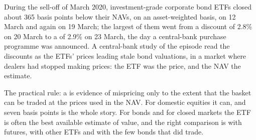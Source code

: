 \begin{example}[March 2020]\label{ex:m1:exchange-traded-funds:march}
During the sell-off of March 2020, investment-grade corporate bond ETFs
closed about 365 basis points below their NAVs, on an asset-weighted basis,
on 12 March and again on 19 March; the largest of them went from a discount
of 2.8\% on 20 March to a  of 2.9\% on 23 March, the day a central-bank
purchase programme was announced. A central-bank study of the episode read
the discounts as the ETFs' prices leading stale bond valuations, in a market
where dealers had stopped making prices: the ETF was the price, and the NAV
the estimate.
\end{example}

\begin{omfigure}

\label{fig:m1:exchange-traded-funds:stale}
\end{omfigure}

The practical rule: a  is evidence of mispricing only to the extent
that the basket can be traded at the prices used in the NAV. For domestic
equities it can, and seven basis points is the whole story. For bonds and
for closed markets the ETF is often the best available estimate of value, and
the right comparison is with futures, with other ETFs and with the few bonds
that did trade.

